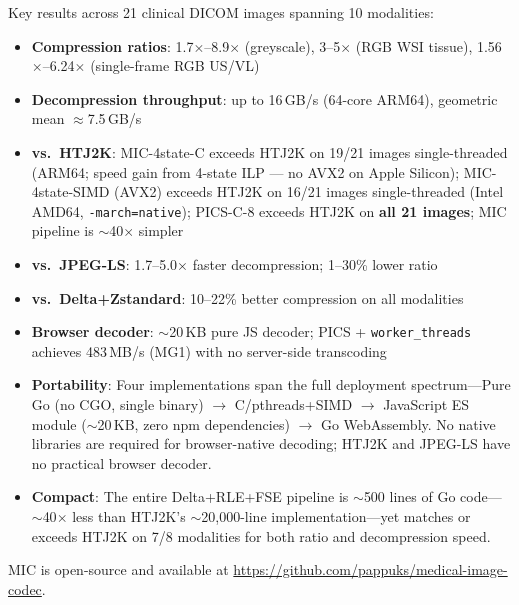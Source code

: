 \documentclass[10pt,twocolumn]{article}
\begin{document}
Key results across 21 clinical DICOM images spanning 10 modalities:
\begin{itemize}
  \item \textbf{Compression ratios}: 1.7$\times$--8.9$\times$ (greyscale), 3--5$\times$ (RGB WSI tissue), 1.56$\times$--6.24$\times$ (single-frame RGB US/VL)
  \item \textbf{Decompression throughput}: up to 16\,GB/s (64-core ARM64), geometric mean $\approx$7.5\,GB/s
  \item \textbf{vs.\ HTJ2K}: MIC-4state-C exceeds HTJ2K on 19/21 images single-threaded (ARM64; speed gain from 4-state ILP --- no AVX2 on Apple Silicon); MIC-4state-SIMD (AVX2) exceeds HTJ2K on 16/21 images single-threaded (Intel AMD64, \texttt{-march=native}); PICS-C-8 exceeds HTJ2K on \textbf{all 21 images}; MIC pipeline is $\sim$40$\times$ simpler
  \item \textbf{vs.\ JPEG-LS}: 1.7--5.0$\times$ faster decompression; 1--30\% lower ratio
  \item \textbf{vs.\ Delta+Zstandard}: 10--22\% better compression on all modalities
  \item \textbf{Browser decoder}: $\sim$20\,KB pure JS decoder; PICS + \texttt{worker\_threads} achieves 483\,MB/s (MG1) with no server-side transcoding
  \item \textbf{Portability}: Four implementations span the full deployment spectrum---Pure Go (no CGO, single binary) $\to$ C/pthreads+SIMD $\to$ JavaScript ES module ($\sim$20\,KB, zero npm dependencies) $\to$ Go WebAssembly. No native libraries are required for browser-native decoding; HTJ2K and JPEG-LS have no practical browser decoder.
  \item \textbf{Compact}: The entire Delta+RLE+FSE pipeline is $\sim$500 lines of Go code---$\sim$40$\times$ less than HTJ2K's $\sim$20,000-line implementation---yet matches or exceeds HTJ2K on 7/8 modalities for both ratio and decompression speed.
\end{itemize}

MIC is open-source and available at \url{https://github.com/pappuks/medical-image-codec}.
\end{document}
